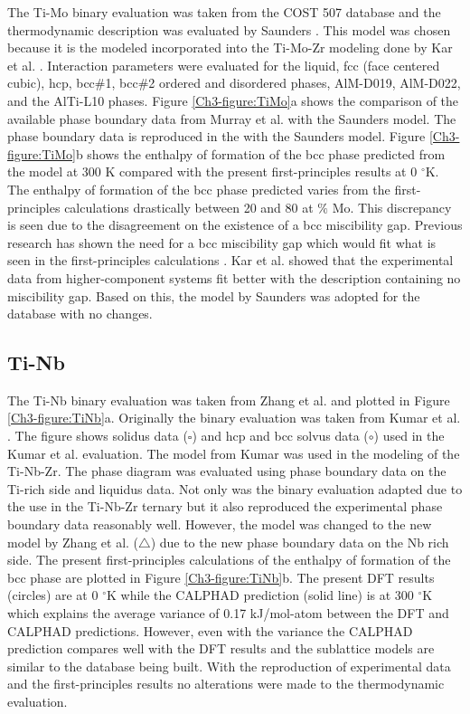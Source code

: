 The Ti-Mo binary evaluation was taken from the COST 507 database and the thermodynamic description was evaluated by Saunders \cite{Ansara1998}. This model was chosen because it is the modeled incorporated into the Ti-Mo-Zr modeling done by Kar et al. \cite{Kar2008}. Interaction parameters were evaluated for the liquid, fcc (face centered cubic), hcp, bcc$\#$1, bcc$\#$2 ordered and disordered phases, AlM-D019, AlM-D022, and the AlTi-L10 phases. Figure \ref{Ch3-figure:TiMo}a shows the comparison of the available phase boundary data from Murray et al. \cite{Murray1981} with the Saunders model. The phase boundary data is reproduced in the with the Saunders model. Figure \ref{Ch3-figure:TiMo}b shows the enthalpy of formation of the bcc phase predicted from the model at 300 K compared with the present first-principles results at 0 $^\circ$K. The enthalpy of formation of the bcc phase predicted varies from the first-principles calculations drastically between 20 and 80 at $\%$ Mo. This discrepancy is seen due to the disagreement on the existence of a bcc miscibility gap. Previous research has shown the need for a bcc miscibility gap which would fit what is seen in the first-principles calculations \cite{Predel1997,Hoffman1967}. Kar et al. showed that the experimental data from higher-component systems fit better with the description containing no miscibility gap. Based on this, the model by Saunders was adopted for the database with no changes. 

\subsection{Ti-Nb}

The Ti-Nb binary evaluation was taken from Zhang et al. \cite{Zhang2001} and plotted in Figure \ref{Ch3-figure:TiNb}a. Originally the binary evaluation was taken from Kumar et al. \cite{Kumar1994}. The figure shows solidus data ($\square$) and hcp and bcc solvus data ($\circ$) used in the Kumar et al. evaluation. The model from Kumar was used in the modeling of the Ti-Nb-Zr. The phase diagram was evaluated using phase boundary data on the Ti-rich side and liquidus data. Not only was the binary evaluation adapted due to the use in the Ti-Nb-Zr ternary but it also reproduced the experimental phase boundary data reasonably well. However, the model was changed to the new model by Zhang et al. ($\triangle$) due to the new phase boundary data on the Nb rich side. The present first-principles calculations of the enthalpy of formation of the bcc phase are plotted in Figure \ref{Ch3-figure:TiNb}b. The present DFT results (circles) are at 0 $^\circ$K while the CALPHAD prediction (solid line) is at 300 $^\circ$K which explains the average variance of 0.17 kJ/mol-atom between the DFT and CALPHAD predictions. However, even with the variance the CALPHAD prediction compares well with the DFT results and the sublattice models are similar to the database being built. With the reproduction of experimental data and the first-principles results no alterations were made to the thermodynamic evaluation.

